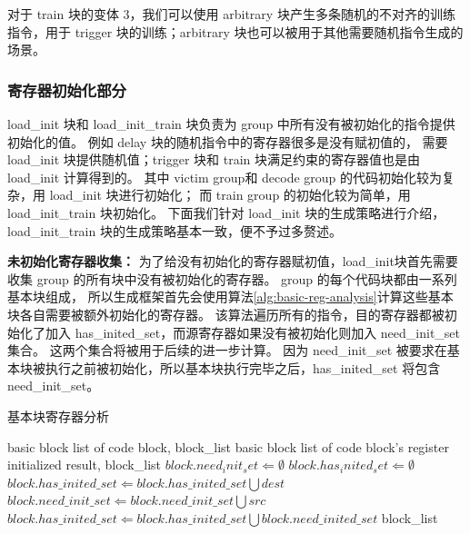 对于 train 块的变体 3，我们可以使用 arbitrary 块产生多条随机的不对齐的训练指令，用于 trigger 块的训练；arbitrary 块也可以被用于其他需要随机指令生成的场景。\par

\subsubsection{寄存器初始化部分}

load\_init 块和 load\_init\_train 块负责为 group 中所有没有被初始化的指令提供初始化的值。
例如 delay 块的随机指令中的寄存器很多是没有赋初值的，
需要 load\_init 块提供随机值；trigger 块和 train 块满足约束的寄存器值也是由 load\_init 计算得到的。
其中 victim group和 decode group 的代码初始化较为复杂，用 load\_init 块进行初始化；
而 train group 的初始化较为简单，用 load\_init\_train 块初始化。
下面我们针对 load\_init 块的生成策略进行介绍，load\_init\_train 块的生成策略基本一致，便不予过多赘述。\par

\textbf{未初始化寄存器收集：}
为了给没有初始化的寄存器赋初值，load\_init块首先需要收集 group 的所有块中没有被初始化的寄存器。
group 的每个代码块都由一系列基本块组成，
所以生成框架首先会使用算法\ref{alg:basic-reg-analysis}计算这些基本块各自需要被额外初始化的寄存器。
该算法遍历所有的指令，目的寄存器都被初始化了加入 has\_inited\_set，而源寄存器如果没有被初始化则加入 need\_init\_set 集合。
这两个集合将被用于后续的进一步计算。
因为 need\_init\_set 被要求在基本块被执行之前被初始化，所以基本块执行完毕之后，has\_inited\_set 将包含  need\_init\_set。 \par

\begin{algorithm}[!h]
    
    \caption{基本块寄存器分析}
    \label{alg:basic-reg-analysis}
    \renewcommand{\algorithmicrequire}{\textbf{Input:}}
    \renewcommand{\algorithmicensure}{\textbf{Output:}}
    
    \begin{algorithmic}[1]
        \REQUIRE basic block list of code block, block\_list  %
        \ENSURE  basic block list of code block's register initialized result, block\_list  %
            \STATE $block.need_init_set \Leftarrow \emptyset$
            \STATE $block.has_inited_set \Leftarrow \emptyset$
                    \STATE $block.has\_inited\_set \Leftarrow block.has\_inited\_set \bigcup dest$
                \ENDFOR
                        \STATE $block.need\_init\_set \Leftarrow block.need\_init\_set \bigcup src$
                    \ENDIF
                \ENDFOR
            \ENDFOR
            \STATE $block.has\_inited\_set \Leftarrow block.has\_inited\_set \bigcup block.need\_inited\_set$
        \ENDFOR
        \RETURN block\_list
    \end{algorithmic}
\end{algorithm}

